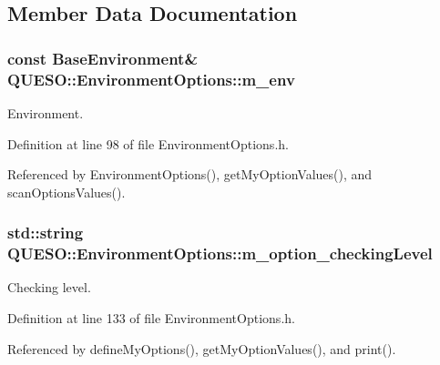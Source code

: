\subsection{Member Data Documentation}
\hypertarget{class_q_u_e_s_o_1_1_environment_options_afe57e2cd6bb9e71df65fe6d133371478}{
\subsubsection[{m\-\_\-env}]{\setlength{\rightskip}{0pt plus 5cm}const {\bf Base\-Environment}\& Q\-U\-E\-S\-O\-::\-Environment\-Options\-::m\-\_\-env\hspace{0.3cm}{\ttfamily [private]}}}\label{class_q_u_e_s_o_1_1_environment_options_afe57e2cd6bb9e71df65fe6d133371478}


Environment. 



Definition at line 98 of file Environment\-Options.\-h.



Referenced by Environment\-Options(), get\-My\-Option\-Values(), and scan\-Options\-Values().

\hypertarget{class_q_u_e_s_o_1_1_environment_options_acd9571003814792e4214aab6969cc397}{
\subsubsection[{m\-\_\-option\-\_\-checking\-Level}]{\setlength{\rightskip}{0pt plus 5cm}std\-::string Q\-U\-E\-S\-O\-::\-Environment\-Options\-::m\-\_\-option\-\_\-checking\-Level\hspace{0.3cm}{\ttfamily [private]}}}\label{class_q_u_e_s_o_1_1_environment_options_acd9571003814792e4214aab6969cc397}


Checking level. 



Definition at line 133 of file Environment\-Options.\-h.



Referenced by define\-My\-Options(), get\-My\-Option\-Values(), and print().

